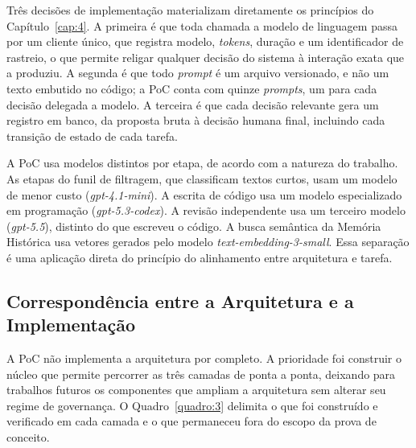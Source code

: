 Três decisões de implementação materializam diretamente os princípios do Capítulo~\ref{cap:4}. A primeira é que toda chamada a modelo de linguagem passa por um cliente único, que registra modelo, \textit{tokens}, duração e um identificador de rastreio, o que permite religar qualquer decisão do sistema à interação exata que a produziu. A segunda é que todo \textit{prompt} é um arquivo versionado, e não um texto embutido no código; a PoC conta com quinze \textit{prompts}, um para cada decisão delegada a modelo. A terceira é que cada decisão relevante gera um registro em banco, da proposta bruta à decisão humana final, incluindo cada transição de estado de cada tarefa.

A PoC usa modelos distintos por etapa, de acordo com a natureza do trabalho. As etapas do funil de filtragem, que classificam textos curtos, usam um modelo de menor custo (\textit{gpt-4.1-mini}). A escrita de código usa um modelo especializado em programação (\textit{gpt-5.3-codex}). A revisão independente usa um terceiro modelo (\textit{gpt-5.5}), distinto do que escreveu o código. A busca semântica da Memória Histórica usa vetores gerados pelo modelo \textit{text-embedding-3-small}. Essa separação é uma aplicação direta do princípio do alinhamento entre arquitetura e tarefa.

\subsection{Correspondência entre a Arquitetura e a Implementação}\label{sec:5.2.2}

A PoC não implementa a arquitetura por completo. A prioridade foi construir o núcleo que permite percorrer as três camadas de ponta a ponta, deixando para trabalhos futuros os componentes que ampliam a arquitetura sem alterar seu regime de governança. O Quadro~\ref{quadro:3} delimita o que foi construído e verificado em cada camada e o que permaneceu fora do escopo da prova de conceito.

